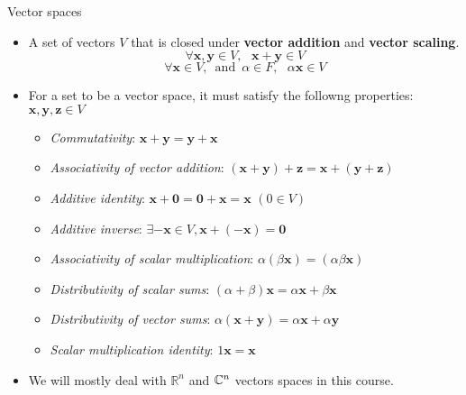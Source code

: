 \documentclass[aspectratio=169]{beamer}
\let\olditem\item
\renewcommand{\item}{\setlength{\itemsep}{\fill}\olditem}
\def\mb{\ensuremath\mathbb}
\begin{document}
\begin{frame}[t]{Vector spaces}
\begin{itemize}
\item A set of vectors $V$ that is closed under \textbf{vector addition} and \textbf{vector scaling}.
\[  \forall \mathbf{x}, \mathbf{y} \in V, \,\,\,\, \mathbf{x} + \mathbf{y} \in V \]
\[  \forall \mathbf{x} \in V, \,\,\, \mathrm{and} \,\,\, \alpha \in F, \,\,\,\, \alpha \mathbf{x} \in V \]
\item For a set to be a vector space, it must satisfy the followng properties: $\mathbf{x}, \mathbf{y}, \mathbf{z} \in V$
\begin{itemize}
\item \textit{Commutativity}: $\mathbf{x} + \mathbf{y} = \mathbf{y} + \mathbf{x}$
\item \textit{Associativity of vector addition}: $(\mathbf{x} + \mathbf{y}) + \mathbf{z} = \mathbf{x} + (\mathbf{y} + \mathbf{z})$
\item \textit{Additive identity}: $\mathbf{x} + \mathbf{0} = \mathbf{0} + \mathbf{x} = \mathbf{x}$ $\left(0 \in V\right)$
\item \textit{Additive inverse}: $\exists -\mathbf{x} \in V, \mathbf{x} + (-\mathbf{x}) = \mathbf{0}$
\item \textit{Associativity of scalar multiplication}: $\alpha\left(\beta \mathbf{x}\right) = \left(\alpha\beta \mathbf{x}\right)$
\item \textit{Distributivity of scalar sums}: $\left(\alpha + \beta\right)\mathbf{x} = \alpha \mathbf{x} + \beta \mathbf{x}$
\item \textit{Distributivity of vector sums}: $\alpha\left(\mathbf{x} + \mathbf{y}\right) = \alpha \mathbf{x} + \alpha \mathbf{y}$
\item \textit{Scalar multiplication identity}: $1\mathbf{x} = \mathbf{x}$
\end{itemize}
\item We will mostly deal with $\mathbb{R}^n$ and $\mb{C}^n$ vectors spaces in this course.
\end{itemize}
\end{frame}
\end{document}
